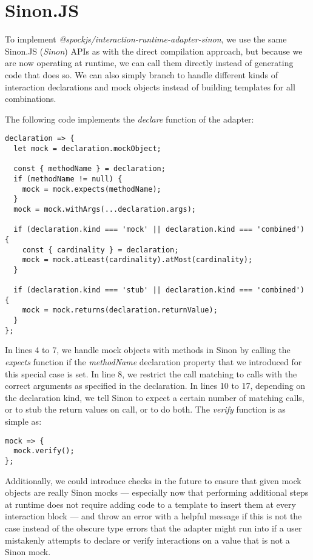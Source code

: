 \section{Sinon.JS}
To implement \textit{@spockjs/interaction-runtime-adapter-sinon},
we use the same Sinon.JS (\textit{Sinon}) APIs
as with the direct compilation approach,
but because we are now operating at runtime,
we can call them directly instead of generating code that does so.
We can also simply branch to handle
different kinds of interaction declarations and mock objects
instead of building templates for all combinations.

The following code implements the \textit{declare} function of the adapter:
\begin{verbatim}
declaration => {
  let mock = declaration.mockObject;

  const { methodName } = declaration;
  if (methodName != null) {
    mock = mock.expects(methodName);
  }
  mock = mock.withArgs(...declaration.args);

  if (declaration.kind === 'mock' || declaration.kind === 'combined') {
    const { cardinality } = declaration;
    mock = mock.atLeast(cardinality).atMost(cardinality);
  }

  if (declaration.kind === 'stub' || declaration.kind === 'combined') {
    mock = mock.returns(declaration.returnValue);
  }
};
\end{verbatim}
In lines 4 to 7, we handle mock objects with methods in Sinon
by calling the \textit{expects} function if
the \textit{methodName} declaration property
that we introduced for this special case is set.
In line 8, we restrict the call matching
to calls with the correct arguments as specified in the declaration.
In lines 10 to 17,
depending on the declaration kind,
we tell Sinon to expect a certain number of matching calls,
or to stub the return values on call, or to do both.
The \textit{verify} function is as simple as:
\begin{verbatim}
mock => {
  mock.verify();
};
\end{verbatim}

Additionally, we could introduce checks in the future to ensure
that given mock objects are really Sinon mocks
--- especially now that performing additional steps at runtime
does not require adding code to a template to
insert them at every interaction block ---
and throw an error with a helpful message if this is not the case
instead of the obscure type errors that the adapter might run into
if a user mistakenly attempts to declare or verify interactions
on a value that is not a Sinon mock.
